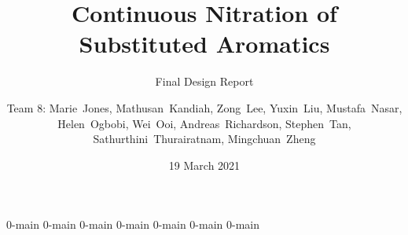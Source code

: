 \documentclass{nitroma-report}
\subtitle{Final Design Report}
\title{Continuous Nitration of Substituted Aromatics}
\author{Team 8: Marie~Jones, Mathusan~Kandiah, Zong~Lee, Yuxin~Liu, Mustafa~Nasar, Helen~Ogbobi, Wei~Ooi, Andreas~Richardson, Stephen~Tan, Sathurthini~Thurairatnam, Mingchuan~Zheng}
\date{19 March 2021}
\begin{document}
\maketitle



\tableofcontents

{0-main}
{0-main}
{0-main}
{0-main}
{0-main}
{0-main}
{0-main}
\end{document}
